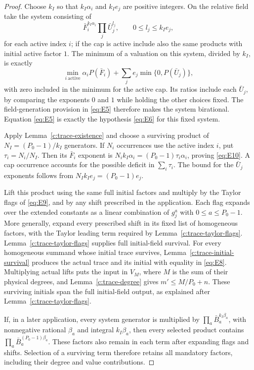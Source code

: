 \begin{proof}
Choose $k_I$ so that $k_I\alpha_i$ and $k_Ie_j$ are positive integers.
On the relative field take the system consisting of
\[
 \bar F_i^{k_I\alpha_i}\prod_j\bar U_j^{l_j},
 \qquad 0\le l_j\le k_Ie_j,
\]
for each active index $i$; if the cap is active include also the same
products with initial active factor $1$.  The minimum of a valuation on
this system, divided by $k_I$, is exactly
\[
 \min_{i\ \mathrm{active}}\alpha_iP(\bar F_i)
        +\sum_je_j\min\{0,P(\bar U_j)\},
\]
with zero included in the minimum for the active cap.  Its ratios include
each $\bar U_j$, by comparing the exponents $0$ and $1$ while holding
the other choices fixed.  The field-generation provision in
\eqref{eq:E5} therefore makes the system birational.  Equation
\eqref{eq:E5} is exactly the hypothesis \eqref{eq:E6} for this fixed
system.

Apply Lemma~\ref{c:trace-existence} and choose a surviving product of
$N_I=(P_0-1)/k_I$ generators.  If $N_i$ occurrences use the active index
$i$, put $\tau_i=N_i/N_I$.  Then its $\bar F_i$ exponent is
$N_ik_I\alpha_i=(P_0-1)\tau_i\alpha_i$, proving \eqref{eq:E10}.
A cap occurrence accounts for the possible deficit in $\sum_i\tau_i$.
The bound for the $\bar U_j$ exponents follows from
$N_Ik_Ie_j=(P_0-1)e_j$.

Lift this product using the same full initial factors and multiply by
the Taylor flags of \eqref{eq:E9}, and by any shift prescribed in the
application.  Each flag expands over the extended constants as a linear
combination of $g_j^a$ with $0\le a\le P_0-1$.  More generally, expand
every prescribed shift in its fixed list of homogeneous factors, with
the Taylor leading term required by Lemma~\ref{c:trace-taylor-flags}.
Lemma~\ref{c:trace-taylor-flags} supplies full initial-field survival.
For every homogeneous summand whose initial trace survives,
Lemma~\ref{c:trace-initial-survival} produces the actual trace and its
initial with equality in \eqref{eq:E8}.  Multiplying actual lifts puts
the input in $V_M$, where $M$ is the sum of their physical degrees, and
Lemma~\ref{c:trace-degree} gives $m'\le M/P_0+n$.
These surviving initials span the full initial-field output, as explained
after Lemma~\ref{c:trace-taylor-flags}.

If, in a later application, every system generator is multiplied by
$\prod_a\bar B_a^{k_I\beta_a}$, with nonnegative rational $\beta_a$
and integral $k_I\beta_a$, then every selected product contains
$\prod_a\bar B_a^{(P_0-1)\beta_a}$.  These factors also remain in each
term after expanding flags and shifts.  Selection of a surviving term
therefore retains all mandatory factors, including their degree and
value contributions.


\end{proof}
